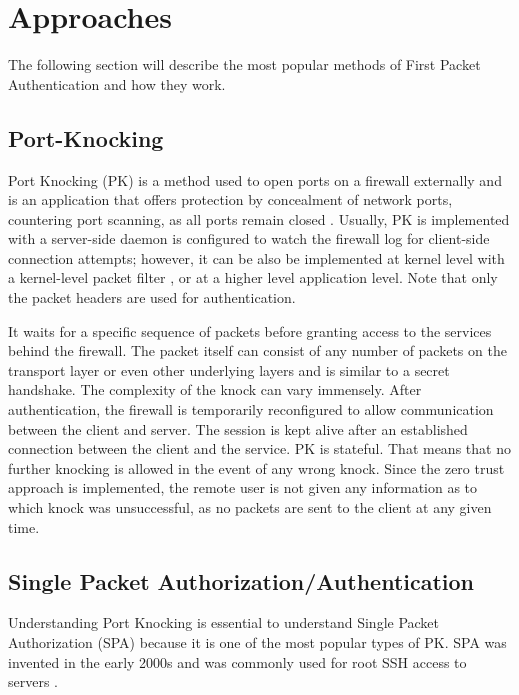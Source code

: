 \section{Approaches}
\label{sec:Methods}

The following section will describe the most popular methods of First Packet Authentication and how they work.

\subsection{Port-Knocking}

Port Knocking (PK) is a method used to open ports on a firewall externally and is an application that offers protection by concealment of network ports, countering port scanning, as all ports remain closed \cite{8494695}.  Usually, PK is implemented with a server-side daemon is configured to watch the firewall log for client-side connection attempts; however, it can be also be implemented at kernel level with a kernel-level packet filter \cite{kernel}, or at a higher level application level.  Note that only the packet headers are used for authentication.\\\par
It waits for a specific sequence of packets before granting access to the services behind the firewall.  The packet itself can consist of any number of packets on the transport layer or even other underlying layers and is similar to a secret handshake.  The complexity of the knock can vary immensely. 
After authentication, the firewall is temporarily reconfigured to allow communication between the client and server.  The session is kept alive after an established connection between the client and the service.
PK is stateful.  That means that no further knocking is allowed in the event of any wrong knock.  Since the zero trust approach is implemented, the remote user is not given any information as to which knock was unsuccessful, as no packets are sent to the client at any given time.\par


\subsection{Single Packet Authorization/Authentication}

Understanding Port Knocking is essential to understand Single Packet Authorization (SPA) because it is one of the most popular types of PK.
SPA was invented in the early 2000s and was commonly used for root SSH access to servers \cite{networkinsight}.\\\par

